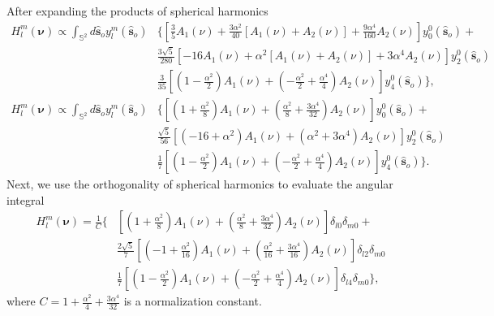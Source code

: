 \documentclass{osa-article}
\providecommand{\so}[1]{\mathbf{\hat{s}}_o}
\providecommand{\mbb}[1]{\mathbb{#1}}
\providecommand{\bs}[1]{\boldsymbol{#1}}
\begin{document}
After expanding the products of spherical harmonics
\begin{align}
  H_l^m(\bs{\nu}) \propto \int_{\mbb{S}^2}d\so{}y_l^m(\so{})&\Bigg\{\left[\frac{3}{5}A_1(\nu) + \frac{3\alpha^2}{40}[A_1(\nu) + A_2(\nu)] + \frac{9\alpha^4}{160}A_2(\nu)\right]y_0^0(\so{})+\nonumber\\&\frac{3\sqrt{5}}{280}\left[-16A_1(\nu) + \alpha^2[A_1(\nu) + A_2(\nu)] + 3\alpha^4 A_2(\nu)\right]y_2^0(\so{})\nonumber\\&\frac{3}{35}\left[\left(1 - \frac{\alpha^2}{2}\right)A_1(\nu) + \left(-\frac{\alpha^2}{2} + \frac{\alpha^4}{4}\right)A_2(\nu)\right]y_4^0(\so{})\Bigg\},\\
  H_l^m(\bs{\nu}) \propto \int_{\mbb{S}^2}d\so{}y_l^m(\so{})&\Bigg\{\left[\left(1 + \frac{\alpha^2}{8}\right)A_1(\nu) + \left(\frac{\alpha^2}{8} + \frac{3\alpha^4}{32}\right)A_2(\nu)\right]y_0^0(\so{}) + \nonumber\\&\frac{\sqrt{5}}{56}\left[(-16 + \alpha^2)A_1(\nu) + (\alpha^2 + 3\alpha^4)A_2(\nu)\right]y_2^0(\so{})\nonumber\\&\frac{1}{7}\left[\left(1 - \frac{\alpha^2}{2}\right)A_1(\nu) + \left(-\frac{\alpha^2}{2} + \frac{\alpha^4}{4}\right)A_2(\nu)\right]y_4^0(\so{})\Bigg\}.
\end{align}
Next, we use the orthogonality of spherical harmonics to evaluate the angular integral
\begin{align}
  H_l^m(\bs{\nu}) = \frac{1}{C}\Bigg\{&\left[\left(1 + \frac{\alpha^2}{8}\right)A_1(\nu) + \left(\frac{\alpha^2}{8} + \frac{3\alpha^4}{32}\right)A_2(\nu)\right]\delta_{l0}\delta_{m0}+\nonumber\\&\frac{2\sqrt{5}}{7}\left[\left(-1 + \frac{\alpha^2}{16}\right)A_1(\nu) + \left(\frac{\alpha^2}{16} + \frac{3\alpha^4}{16}\right)A_2(\nu)\right]\delta_{l2}\delta_{m0}\nonumber\\&\frac{1}{7}\left[\left(1 - \frac{\alpha^2}{2}\right)A_1(\nu) + \left(-\frac{\alpha^2}{2} + \frac{\alpha^4}{4}\right)A_2(\nu)\right]\delta_{l4}\delta_{m0}\Bigg\}, 
\end{align}
where $C = 1 + \frac{\alpha^2}{4} + \frac{3\alpha^4}{32}$ is a normalization
constant.
\end{document}
